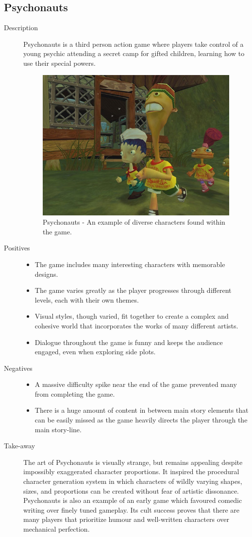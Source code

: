 \clearpage
\subsection{Psychonauts}
\begin{description}
\item[Description]{Psychonauts is a third person action game where players take control of a young psychic attending a secret camp for gifted children, learning how to use their special powers.

\begin{figure}[htb]
	\centering\includegraphics[width=.25\linewidth]{images/game_psychonauts}
	\caption{Psychonauts - An example of diverse characters found within the game.}
\end{figure}}
\item[Positives]{
\begin{itemize}
\item{The game includes many interesting characters with memorable designs.}
\item{The game varies greatly as the player progresses through different levels, each with their own themes.}
\item{Visual styles, though varied, fit together to create a complex and cohesive world that incorporates the works of many different artists.}
\item{Dialogue throughout the game is funny and keeps the audience engaged, even when exploring side plots.}
\end{itemize}
}
\item[Negatives]{
\begin{itemize}
\item{A massive difficulty spike near the end of the game prevented many from completing the game.}
\item{There is a huge amount of content in between main story elements that can be easily missed as the game heavily directs the player through the main story-line.}
\end{itemize}
}
\item[Take-away]{The art of Psychonauts is visually strange, but remains appealing despite impossibly exaggerated character proportions. It inspired the procedural character generation system in which characters of wildly varying shapes, sizes, and proportions can be created without fear of artistic dissonance. Psychonauts is also an example of an early game which favoured comedic writing over finely tuned gameplay. Its cult success proves that there are many players that prioritize humour and well-written characters over mechanical perfection. }
\end{description}



